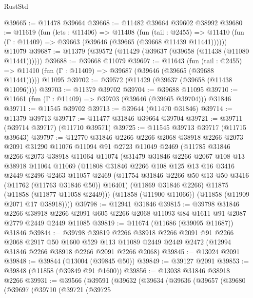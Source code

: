 \begin{lexlean}{RustStd}
\begin{coremodule}
@39665 := @11478 @39664
@39668 := @11482 @39664 @39602 @38992
@39680 := @11619
    (fun (lets : @11406) =>
    @11408
      (fun (tail : @2455) =>
      @11410 (fun (Γ : @11409) => @39663 (@39646 (@39665 (@39668 @11439 @11441))))))
    @11079
@39687 := @11379 (@39572 (@11429 (@39637 (@39658 (@11438 (@11080 @11441))))))
@39688 := @39668 @11079
@39697 := @11643
    (fun (tail : @2455) => @11410 (fun (Γ : @11409) => @39687 (@39646 (@39665 (@39688 @11441)))))
    @11095
@39702 := @39572 (@11429 (@39637 (@39658 (@11438 @11096))))
@39703 := @11379 @39702
@39704 := @39688 @11095
@39710 := @11661 (fun (Γ : @11409) => @39703 (@39646 (@39665 @39704))) @31846
@39711 := @11545 @39702
@39713 := @39644 (@11470 @31846)
@39714 := @11379 @39713
@39717 := @11477 @31846 @39664 @39704
@39721 := @39711 (@39714 @39717) (@11710 @39571)
@39725 := @11545 @39713 @39717 (@11715 @39643)
@39797 := @12770
    @31846
    @2266
    @2266
    @2068
    @38918
    @2266
    @2073
    @2091
    @31290
    @11076
    @11094
    @91
    @2723
    @11049
    @2469
    (@11785
      @31846
      @2266
      @2073
      @38918
      @11064
      @11074
      (@31479
        @31846
        @2266
        @2067
        @108
        @13
        @38918
        @11064
        @11069
        (@11808
          @31846
          @2266
          @108
          @125
          @13
          @16
          @3416
          @2449
          @2496
          @2463
          @11057
          @2469
          (@11754 @31846 @2266 @50 @13 @50 @3416 (@11762 (@11763 @31846 @50)) @16401)
          (@11869 @31846 @2266)
          @11875
          (@11858 (@11877 @11058 @2449)))
        (@11858 (@11900 @11066))
        (@11858 (@11909 @2071 @17 @38918))))
@39798 := @12941 @31846
@39815 := @39798
    @31846
    @2266
    @38918
    @2266
    @2091
    @605
    @2266
    @2068
    @11093
    @84
    @1611
    @91
    @2087
    @2779
    @2449
    @2449
    @11085
@39819 := @11674 (@11686 (@39095 @11687)) @31846
@39844 := @39798
    @39819
    @2266
    @38918
    @2266
    @2091
    @91
    @2266
    @2068
    @2917
    @50
    @1600
    @529
    @113
    @11089
    @2449
    @2449
    @2472
    (@12994 @31846 @2266 @38918 @2266 @2091 @2266 @2068)
@39845 := @13024 @2091
@39848 := @39844 (@13004 (@39845 @50))
@39849 := @39127 @2091
@39853 := @39848 (@11858 (@39849 @91 @1600))
@39856 := @13038 @31846 @38918 @2266
@39931 := @39566
    (@39591
      (@39632
        (@39634
          (@39636
            (@39657
              (@39680
                (@39697
                  (@39710
                    (@39721
                      (@39725

\end{coremodule}
\end{lexlean}
